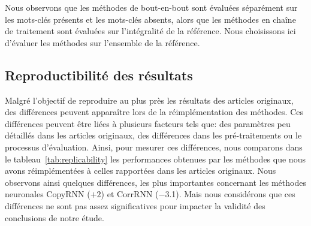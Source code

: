 %
Nous observons que les méthodes de bout-en-bout sont évaluées séparément sur les mots-clés présents et les mots-clés absents, alors que les méthodes en chaîne de traitement sont évaluées sur l'intégralité de la référence.
Nous choisissons ici d'évaluer les méthodes sur l'ensemble de la référence.
%
%


\subsection{Reproductibilité des résultats}

Malgré l'objectif de reproduire au plus près les résultats des articles originaux, des différences peuvent apparaître lors de la réimplémentation des méthodes.
Ces différences peuvent être liées à plusieurs facteurs tels que: des paramètres peu détaillés dans les articles originaux, des différences dans les pré-traitements ou le processus d'évaluation.
Ainsi, pour mesurer ces différences, nous comparons dans le tableau~\ref{tab:replicability} les performances obtenues par les méthodes que nous avons réimplémentées à celles rapportées dans les articles originaux.
%
Nous observons ainsi quelques différences, les plus importantes concernant les méthodes neuronales CopyRNN ($+2$) et CorrRNN (\num{-3.1}).
Mais nous considérons que ces différences ne sont pas assez significatives pour impacter la validité des conclusions de notre étude.



